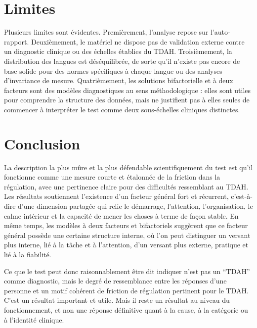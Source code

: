 \documentclass[11pt,a4paper]{article}
\begin{document}
\section{Limites}
Plusieurs limites sont évidentes. Premièrement, l’analyse repose sur l’auto-rapport. Deuxièmement, le matériel ne dispose pas de validation externe contre un diagnostic clinique ou des échelles établies du TDAH. Troisièmement, la distribution des langues est déséquilibrée, de sorte qu’il n’existe pas encore de base solide pour des normes spécifiques à chaque langue ou des analyses d’invariance de mesure. Quatrièmement, les solutions bifactorielle et à deux facteurs sont des modèles diagnostiques au sens méthodologique : elles sont utiles pour comprendre la structure des données, mais ne justifient pas à elles seules de commencer à interpréter le test comme deux sous-échelles cliniques distinctes.

\section{Conclusion}
La description la plus mûre et la plus défendable scientifiquement du test est qu’il fonctionne comme une mesure courte et étalonnée de la friction dans la régulation, avec une pertinence claire pour des difficultés ressemblant au TDAH. Les résultats soutiennent l’existence d’un facteur général fort et récurrent, c’est-à-dire d’une dimension partagée qui relie le démarrage, l’attention, l’organisation, le calme intérieur et la capacité de mener les choses à terme de façon stable. En même temps, les modèles à deux facteurs et bifactoriels suggèrent que ce facteur général possède une certaine structure interne, où l’on peut distinguer un versant plus interne, lié à la tâche et à l’attention, d’un versant plus externe, pratique et lié à la fiabilité.

Ce que le test peut donc raisonnablement être dit indiquer n’est pas un ``TDAH'' comme diagnostic, mais le degré de ressemblance entre les réponses d’une personne et un motif cohérent de friction de régulation pertinent pour le TDAH. C’est un résultat important et utile. Mais il reste un résultat au niveau du fonctionnement, et non une réponse définitive quant à la cause, à la catégorie ou à l’identité clinique.

\printbibliography
\end{document}
